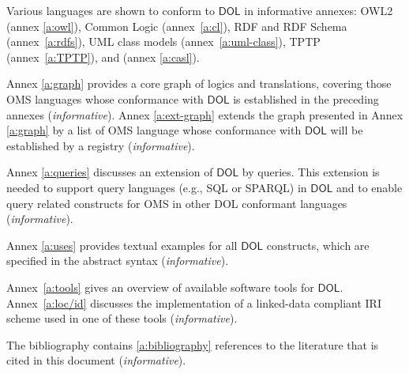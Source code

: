 \documentclass[10pt, a4paper]{isov2}
\newcommand*{\DOL}{\ensuremath{\mathsf{DOL}}\xspace}
\begin{document}
\medskip \noindent Various languages are shown to  conform to \DOL in
informative annexes: OWL2 (annex \ref{a:owl}), Common Logic
(annex~\ref{a:cl}), RDF and RDF Schema (annex~\ref{a:rdfs}), UML class
models (annex~\ref{a:uml-class}), TPTP (annex~\ref{a:TPTP}), and
\CASL (annex \ref{a:casl}).

\medskip \noindent 
Annex \ref{a:graph}  provides a core graph of logics and translations, covering those OMS languages
whose conformance with \DOL is established in the preceding annexes (\emph{informative}). 
Annex \ref{a:ext-graph} extends the graph presented in Annex \ref{a:graph}  by a list of OMS
language whose conformance with \DOL will be established by a registry
(\emph{informative}).

\medskip \noindent 
Annex \ref{a:queries} discusses an extension of \DOL{} by queries. This extension is needed
to support query languages (e.g., SQL or SPARQL) in \DOL{} and to enable query related constructs
for OMS in other DOL conformant languages (\emph{informative}). 

\medskip \noindent 
Annex \ref{a:uses} provides textual examples for all \DOL constructs, which 
are specified in the abstract syntax 
(\emph{informative}).


\medskip \noindent 
Annex~\ref{a:tools} gives an overview of available  software tools for
\DOL.  Annex~\ref{a:loc/id} discusses the implementation of a
linked-data compliant IRI scheme used in one of these tools
(\emph{informative}).

\medskip \noindent 
The bibliography contains \ref{a:bibliography} references to the literature that is cited in this document
(\emph{informative}).






\end{document}
